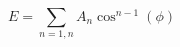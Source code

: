 \documentclass[12pt]{article}
\begin{document}
$$  
  E = \sum_{n=1,n} A_n  \cos^{n-1}(\phi)
$$
\end{document}

